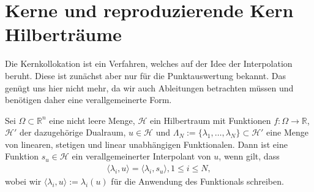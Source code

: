 \chapter{Kerne und reproduzierende Kern Hilberträume}
\label{cha:Grundlagen}

Die Kernkollokation ist ein Verfahren, welches auf der Idee der Interpolation beruht. Diese ist zunächst aber nur für die Punktauswertung bekannt. Das genügt uns hier nicht mehr, da wir auch Ableitungen betrachten müssen und benötigen daher eine verallgemeinerte Form.

\begin{definition}
Sei $\Omega \subset \mathbb{R}^n$ eine nicht leere Menge, $\mathcal{H}$ ein Hilbertraum mit Funktionen $f:\Omega \rightarrow \mathbb{R}$, $\mathcal{H}'$ der dazugehörige Dualraum, $u \in \mathcal{H}$  und $\Lambda_N := \{\lambda_1, \dots, \lambda_N\} \subset \mathcal{H}'$ eine Menge von linearen, stetigen und linear unabhängigen Funktionalen. Dann ist eine Funktion $s_u \in \mathcal{H}$ ein verallgemeinerter Interpolant von $u$, wenn gilt, dass
\begin{align*}
\langle \lambda_i,u \rangle = \langle \lambda_i,s_u \rangle , 1\le i \le N,
\end{align*}
wobei wir $\langle \lambda_i, u \rangle := \lambda_i(u)$ für die Anwendung des Funktionals schreiben.
\end{definition}

